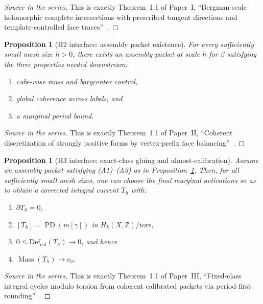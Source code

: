 \documentclass[11pt]{article}
\numberwithin{equation}{section}
\theoremstyle{plain}
\newtheorem{proposition}[theorem]{Proposition}
\theoremstyle{definition}
\theoremstyle{remark}
\DeclareMathOperator{\Mass}{Mass}
\DeclareMathOperator{\PD}{PD}
\newcommand{\Z}{\mathbb{Z}}
\newcommand{\Def}{\mathrm{Def}}
\newcommand{\Defcal}{\Def_{\mathrm{cal}}}
\begin{document}
\begin{proof}[Source in the series]
This is exactly Theorem~1.1 of Paper~I,
``Bergman-scale holomorphic complete intersections with prescribed tangent
directions and template-controlled face traces''~\cite{Washburn26I}.
\end{proof}

\begin{proposition}[H2 interface: assembly packet existence]
\label{prop:h2-package}
For every sufficiently small mesh size $h>0$, there exists an assembly packet
at scale $h$ for $\beta$ satisfying the three properties needed downstream:

\begin{enumerate}
\item[\textnormal{(A1)}] cube-wise mass and barycenter control,
\item[\textnormal{(A2)}] global coherence across labels, and
\item[\textnormal{(A3)}] a marginal period bound.
\end{enumerate}
\end{proposition}

\begin{proof}[Source in the series]
This is exactly Theorem~1.1 of Paper~II,
``Coherent discretization of strongly positive forms by vertex-prefix face
balancing''~\cite{Washburn26II}.
\end{proof}

\begin{proposition}[H3 interface: exact-class gluing and almost-calibration]
\label{prop:h3-package}
Assume an assembly packet satisfying \textnormal{(A1)}--\textnormal{(A3)} as in
Proposition~\ref{prop:h2-package}. Then, for all sufficiently small mesh sizes,
one can choose the final marginal activations so as to obtain a corrected
integral current $T_h$ with:
\begin{enumerate}
\item[\textnormal{(i)}] $\partial T_h=0$,
\item[\textnormal{(ii)}] $[T_h]=\PD(m[\gamma])$ in $H_k(X,\Z)/\mathrm{tors}$,
\item[\textnormal{(iii)}] $0\le \Defcal(T_h)\to 0$, and hence
\item[\textnormal{(iv)}] $\Mass(T_h)\to c_0$.
\end{enumerate}
\end{proposition}

\begin{proof}[Source in the series]
This is exactly Theorem~1.1 of Paper~III,
``Fixed-class integral cycles modulo torsion from coherent calibrated packets via period-first
rounding''~\cite{Washburn26III}.
\end{proof}
\end{document}
